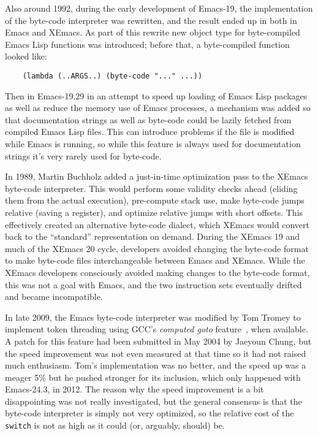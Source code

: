 \documentclass[format=acmsmall, review]{acmart}
\newcommand \Elisp {Emacs Lisp}
\begin{document}
Also around 1992, during the early development of Emacs-19, the
implementation of the byte-code interpreter was rewritten, and the
result ended up in both in Emacs and XEmacs.
As part of this rewrite new object type for byte-compiled \Elisp{}
functions was introduced; before that, a byte-compiled function looked
like:
\begin{verbatim}
    (lambda (..ARGS..) (byte-code "..." ...))
\end{verbatim}
Then in Emacs-19.29 in an attempt to speed up loading of \Elisp{} packages
as well as reduce the memory use of Emacs processes, a mechanism was added
so that documentation strings as well as byte-code could be lazily fetched
from compiled \Elisp{} files.  This can introduce problems if the file is
modified while Emacs is running, so while this feature is always used
for documentation strings it's very rarely used for byte-code.


In 1989, Martin Buchholz added a just-in-time optimization pass to the
XEmacs byte-code interpreter.  This
would perform some validity checks ahead (eliding them from the actual
execution), pre-compute stack use, make byte-code jumps relative
(saving a register), and optimize relative jumps with short offsets.
This effectively created an alternative byte-code dialect, which
XEmacs would convert back to the ``standard'' representation on
demand.
During the XEmacs 19 and much of the XEmacs 20 cycle, developers
avoided changing the byte-code format to make byte-code files
interchangeable between Emacs and XEmacs.  While
the XEmacs developers consciously avoided making changes to the
byte-code format, this was not a goal with Emacs, and the two
instruction sets eventually drifted and became incompatible.

In late 2009, the Emacs byte-code interpreter was modified by Tom Tromey to
implement token threading using GCC's \emph{computed goto} feature~\cite{ComputedGOTO}, when
available.  A patch for this feature had been submitted in May 2004 by
Jaeyoun Chung, but the speed improvement was not even measured at that time
so it had not raised much enthusiasm.  Tom's implementation was no better,
and the speed up was a meager 5\% but he pushed stronger for its inclusion,
which only happened with Emacs-24.3, in 2012.  The reason why the speed
improvement is a bit disappointing was not really investigated, but the
general consensus is that the byte-code interpreter is simply not very
optimized, so the relative cost of the \texttt{switch} is not as high as it
could (or, arguably, should) be.
\end{document}
